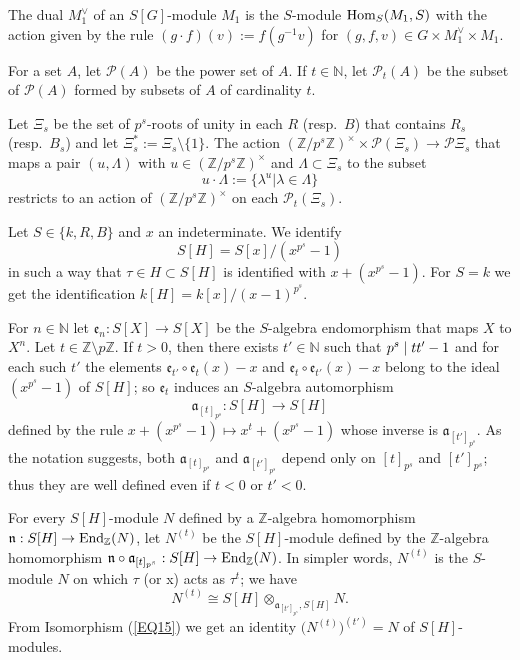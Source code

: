 \documentclass[11pt]{amsart}
\def\End{\textup{End}}
\def\Hom{\textup{Hom}}
\begin{document}
The dual $M_1^{\vee}$ of an $S[G]$-module $M_1$ is the $S$-module $\Hom_S(M_1,S)$ with the action given by the rule $(g\cdot f)(v):=f(g^{-1}v)$ for $(g,f,v)\in G\times M_1^{\vee}\times M_1$.

For a set $A$, let $\mathcal P(A)$ be the power set of $A$. If $t\in\mathbb N$, let $\mathcal P_t(A)$ be the subset of $\mathcal P(A)$ formed by subsets of $A$ of cardinality $t$.

Let $\Xi_s$ be the set of $p^s$-roots of unity in each $R$ (resp.\ $B$) that contains $R_s$ (resp.\ $B_s$) and let $\Xi_s^{\ast}:=\Xi_s\setminus\{1\}$. The action $(\mathbb Z/p^s\mathbb Z)^{\times}\times\mathcal P(\Xi_s)\rightarrow\mathcal P\Xi_s$ that maps a pair $(u,\Lambda)$ with $u\in (\mathbb Z/p^s\mathbb Z)^{\times}$ and $\Lambda\subset\Xi_s$ to the subset 
$$u\cdot\Lambda:=\{\lambda^u|\lambda\in\Lambda\}$$ 
restricts to an action of $(\mathbb Z/p^s\mathbb Z)^{\times}$ on each $\mathcal P_t(\Xi_s)$.

Let $S\in\{k,R,B\}$ and $x$ an indeterminate. We identify 
$$S[H]=S[x]/(x^{p^s}-1)$$ 
in such a way that $\tau\in H\subset S[H]$ is identified with $x+(x^{p^s}-1)$. For $S=k$ we get the identification $k[H]=k[x]/(x-1)^{p^s}$. 

For $n\in\mathbb N$ let $\mathfrak e_n:S[X]\rightarrow S[X]$ be the $S$-algebra endomorphism that maps $X$ to $X^n$. Let $t\in\mathbb Z\setminus p\mathbb Z$. If $t>0$, then there exists $t'\in\mathbb N$ such that $\break p^s\mid tt'-1$ and for each such $t'$ the elements $\mathfrak e_{t'}\circ\mathfrak e_t(x)-x$ and $\mathfrak e_t\circ\mathfrak e_{t'}(x)-x$ belong to the ideal $(x^{p^s}-1)$ of $S[H]$; so $\mathfrak e_t$ induces an $S$-algebra automorphism 
$$\mathfrak a_{[t]_{p^s}}:S[H]\rightarrow S[H]$$ 
defined by the rule $x+(x^{p^s}-1)\mapsto x^t+(x^{p^s}-1)$ whose inverse is $\mathfrak a_{[t']_{p^s}}$. As the notation suggests, both $\mathfrak a_{[t]_{p^s}}$ and $\mathfrak a_{[t']_{p^s}}$ depend only on $[t]_{p^s}$ and $[t']_{p^s}$; thus they are well defined even if $t<0$ or $t'<0$. 

For every $S[H]$-module $N$ defined by a $\mathbb Z$-algebra homomorphism $\break\mathfrak n:S[H]\rightarrow\End_{\mathbb Z}(N)$, let $N^{(t)}$ be the $S[H]$-module defined by the $\mathbb Z$-algebra homomorphism $\mathfrak{n}\circ \mathfrak{a}_{[t]_{p^s}}:S[H]\rightarrow\End_{\mathbb Z}(N)$. In simpler words, $N^{(t)}$ is the $S$-module $N$ on which $\tau$ (or x) acts as $\tau^t$; we have
\begin{equation}\label{EQ15}
N^{(t)}\cong S[H]\otimes_{ \mathfrak a_{[t']_{p^s}},S[H]} N.
\end{equation}
From Isomorphism (\ref{EQ15}) we get an identity $\bigl(N^{(t)}\bigr)^{(t')}=N$ of $S[H]$-modules.
\end{document}
